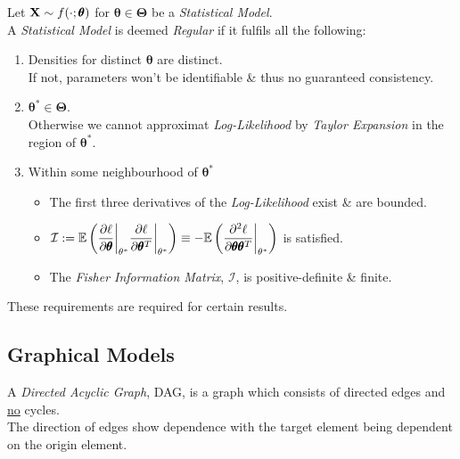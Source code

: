 \documentclass[11pt,a4paper]{article}
\begin{document}
Let $\textbf{X}\sim f(\cdot;\pmb\theta)$ for $\pmb\theta\in\pmb\Theta$ be a \textit{Statistical Model}.\\
A \textit{Statistical Model} is deemed \textit{Regular} if it fulfils all the following:
\begin{enumerate}
	\item Densities for distinct $\pmb\theta$ are distinct.\\
	\nb If not, parameters won't be identifiable \& thus no guaranteed consistency.
	\item $\pmb\theta^*\in\pmb\Theta$.\\
	\nb Otherwise we cannot approximat \textit{Log-Likelihood} by \textit{Taylor Expansion} in the region of $\pmb\theta^*$.
	\item Within some neighbourhood of $\pmb\theta^*$
	\begin{itemize}
		\item The first three derivatives of the \textit{Log-Likelihood} exist \& are bounded.
		\item $\mathcal{I}:=\mathbb{E}\left(\dfrac{\partial\ell}{\partial\pmb\theta}\bigg|_{\theta^*}\dfrac{\partial\ell}{\partial\pmb\theta^T}\bigg|_{\theta^*}\right)\equiv-\mathbb{E}\left(\dfrac{\partial^2\ell}{\partial\pmb\theta\pmb\theta^T}\bigg|_{\theta^*}\right)$ is satisfied.
		\item The \textit{Fisher Information Matrix}, $\mathcal{I}$, is positive-definite \& finite.
	\end{itemize}
\end{enumerate}
\nb These requirements are required for certain results.

\subsection{Graphical Models}

A \textit{Directed Acyclic Graph}, DAG, is a graph which consists of directed edges and \underline{no} cycles.\\
The direction of edges show dependence with the target element being dependent on the origin element.
\end{document}
